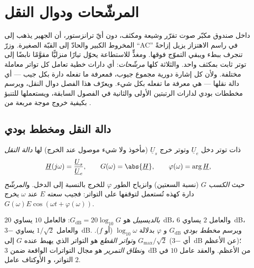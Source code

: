 \chapter{المرشّحات ودوال النقل}\label{ch:b1:filters-transfer-functions}

داخل صندوق مكبّر صوت تقرّر وشيعة ومكثف، دون أيّ
ترانزستور، أن الجهير يذهب إلى المخروط الكبير والحادّ إلى
القبّة الصغيرة. وزرّ ``AC'' في راسم الاهتزاز يزيل إزاحةً
تنجرف ببطء ويبقي التموّج فوقها. ومغذٍّ للاستطاعة يحوّل
تيارًا منزليًّا مقوَّمًا نابضًا إلى توتر ثابت بمكثف واحد.
والثلاثة كلها \emph{مرشّحات}: أي دارات خطية تعامل كل تواتر
معاملة مختلفة. ولأن كل إشارة دورية مجموع جيوب، فمعرفة
ما تفعله دارة بكل جيب --- أي دالة نقلها --- هي
معرفة ما تفعله بكل شيء. ويعرّف هذا الفصل دوال
النقل، ويرسم مخططات بودي لدارات الرتبتين الأولى والثانية في
الفصول السابقة، ويستعملها للتنبؤ بكيفية خروج
موجة مربعة من .

\section{دالة النقل ومخطط بودي}

\begin{definition}\label{def:b1:filters-transfer-functions:H}
 ذات توتر دخل $\underline U_e$ وتوتر
خرج $\underline U_s$ (مأخوذ ولا شيء موصول عند الخرج) لها
\emph{دالة النقل}
\[
\underline H(j\omega) = \frac{\underline U_s}{\underline U_e},
\qquad G(\omega) = \abs{\underline H}, \qquad \varphi(\omega) = \arg\underline H,
\]
حيث \emph{الكسب} $G$ (نسبة السعتين) وانزياح الطور $\varphi$
للخرج بالنسبة إلى الدخل. و\emph{المرشّح} دارة كهذه
تُستعمل لتوقفها على التواتر: فجيب سعته $E$ عند
$\omega$ يخرج $G(\omega)E\cos(\omega t + \varphi(\omega))$.
\end{definition}

\begin{definition}\label{def:b1:filters-transfer-functions:bode}
 \emph{بالديسيبل} هو $G_{\mathrm{dB}} = 20\log_{10}G$: فالعامل
$10$ يساوي \qty{20}{dB}، والعامل $2$ يساوي \qty{6}{dB}، والعامل $1/\sqrt2$ يساوي
\qty{-3}{dB}. ويرسم \emph{مخطط بودي} $G_{\mathrm{dB}}$ و
$\varphi$ بدلالة $\log_{10}\omega$ (أو $f$). و\emph{تواتر
القطع} هو التواتر الذي يهبط عنده $G$ إلى $G_{\max}/\sqrt2$ (أي \qty{-3}{dB} عن
الأعظم)؛ و\emph{نطاق التمرير} هو مجال التواترات الواقعة ضمن
\qty{3}{dB} من الأعظم. والعقد عامل $10$ في التواتر، و
الأوكتاف عامل $2$.
\end{definition}

